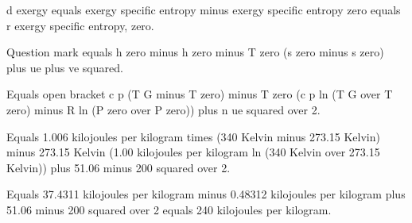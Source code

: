 d exergy equals exergy specific entropy minus exergy specific entropy zero equals r exergy specific entropy, zero.

Question mark equals h zero minus h zero minus T zero (s zero minus s zero) plus ue plus ve squared.

Equals open bracket c p (T G minus T zero) minus T zero (c p ln (T G over T zero) minus R ln (P zero over P zero)) plus n ue squared over 2.

Equals 1.006 kilojoules per kilogram times (340 Kelvin minus 273.15 Kelvin) minus 273.15 Kelvin (1.00 kilojoules per kilogram ln (340 Kelvin over 273.15 Kelvin)) plus 51.06 minus 200 squared over 2.

Equals 37.4311 kilojoules per kilogram minus 0.48312 kilojoules per kilogram plus 51.06 minus 200 squared over 2 equals 240 kilojoules per kilogram.